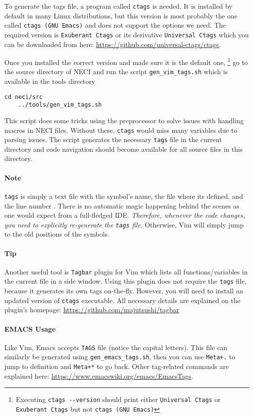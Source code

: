 \documentclass[a4paper,notitlepage]{scrreprt}
\let\code\lstinline
\begin{document}
To generate the tags file, a program called \code{ctags} is needed. It is installed  by default in many Linux distributions, but this version is most probably the one called  \code {ctags (GNU Emacs)} and does not support the options we need. The required version is \code{Exuberant Ctags} or its derivative \code{Universal Ctags} which you can be downloaded from here: \url{https://github.com/universal-ctags/ctags}.

Once you installed the correct version and made sure it is the default one,  \footnote{Executing \code{ctags --version} should print either \code{Universal Ctags} or \code{Exuberant Ctags} but not \code{ctags (GNU Emacs)}} go to the source directory of NECI and run the script \code{gen_vim_tags.sh} which is available in the tools directory
\begin{lstlisting}[gobble=4]
	 cd neci/src
    ../tools/gen_vim_tags.sh
 \end{lstlisting}
 This script does some tricks using the preprocessor to solve issues with handling macros in NECI files.  Without these, \code{ctags} would miss many variables due to parsing issues.
The script generates the necessary \code{tags} file in the current directory and code navigation should become available for all source files in this directory.


\paragraph{Note} \code{tags} is simply a text file with the symbol's name,  the file where its defined, and the line number . There is no automatic magic happening behind the scenes as one would expect from a full-fledged IDE. \emph{Therefore, whenever the code changes, you need to explicitly re-generate the \code{tags} file}. Otherwise, Vim will simply jump to the old positions of the symbols.

\paragraph{Tip} Another useful tool is \code{Tagbar} plugin for Vim which lists all functions/variables in the current file in a side window. Using this plugin does not require the \code{tags} file, because it generates its own tags on-the-fly. However, you will need to install an updated version of \code{ctags} executable. All necessary details are explained on the plugin's homepage: \url{https://github.com/majutsushi/tagbar}


\paragraph{EMACS Usage}
Like Vim, Emacs accepts  \code{TAGS} file (notice the capital letters).
This file can similarly be generated using \code{gen_emacs_tags.sh}, then you can use \code{Meta+.} to jump to definition and \code{Meta+*} to go back. Other tag-related commands are explained here: \url{https://www.emacswiki.org/emacs/EmacsTags}.
\end{document}
